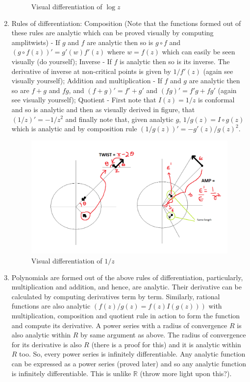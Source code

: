 \documentclass[12pt]{article}
\newcommand{\R}{\mathbb{R}}
\begin{document}
\begin{enumerate}
\begin{figure}[h!]
            \caption{Visual differentiation of $\log z$}
            \label{fig:fig_1}
        \end{figure}
        \item Rules of differentiation: Composition (Note that the functions formed out of these rules are analytic which can be proved visually by computing amplitwists) - If $g$ and $f$ are analytic then so is $g \circ f$ and $(g\circ f(z))' = g'(w)f'(z)$ where $w = f(z)$ which can easily be seen visually (do yourself); Inverse - If $f$ is analytic then so is its inverse. The derivative of inverse at non-critical points is given by $1/f'(z)$ (again see visually yourself); Addition and multiplication - If $f$ and $g$ are analytic then so are $f+g$ and $fg$, and $(f+g)'=f'+g'$ and $(fg)' = f'g + fg'$ (again see visually yourself); Quotient - First note that $I(z) = 1/z$ is conformal and so is analytic and then as visually derived in figure, that $(1/z)' = -1/z^2$ and finally note that, given analytic $g$, $1/g(z) = I \circ g(z)$ which is analytic and by composition rule $(1/g(z))' = -g'(z)/g(z)^2$.
        \begin{figure}[h!]
            \centering
            \includegraphics[scale=0.5]{cinv}
            \caption{Visual differentiation of $1/z$}
            \label{fig:fig_2}
        \end{figure}
        \item Polynomials are formed out of the above rules of differentiation, particularly, multiplication and addition, and hence, are analytic. Their derivative can be calculated by computing derivatives term by term. Similarly, rational functions are also analytic $(f(z)/g(z) = f(z)I(g(z)))$ with multiplication, composition and quotient rule in action to form the function and compute its derivative. A power series with a radius of convergence $R$ is also analytic within $R$ by same argument as above. The radius of convergence for its derivative is also $R$ (there is a proof for this) and it is analytic within $R$ too. So, every power series is infinitely differentiable. Any analytic function can be expressed as a power series (proved later) and so any analytic function is infinitely differentiable. This is unlike $\R$ (throw more light upon this?).

\end{enumerate}
\end{document}
